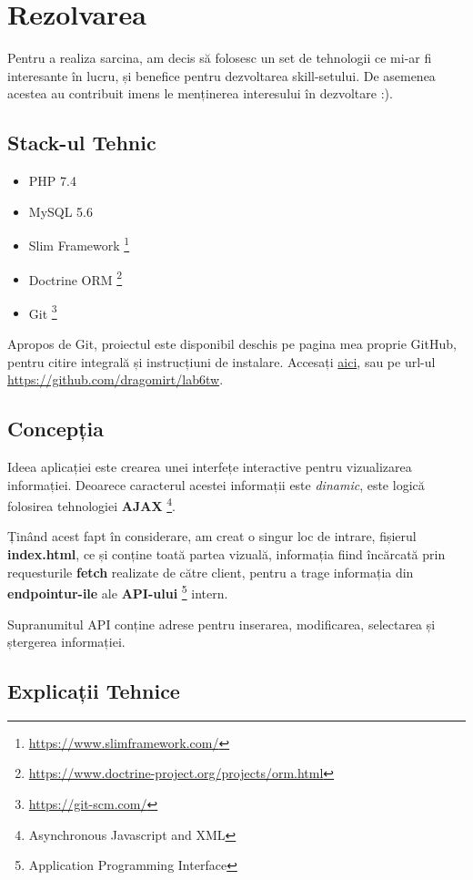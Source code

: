 \documentclass[12pt. a4paper]{report}
\begin{document}
\chapter{Rezolvarea}
Pentru a realiza sarcina, am decis să folosesc un set de tehnologii ce mi-ar fi interesante în lucru, și benefice pentru dezvoltarea skill-setului. De asemenea acestea au contribuit imens le menținerea interesului în dezvoltare :).

\section{Stack-ul Tehnic}
\begin{itemize}
	\item PHP 7.4
	\item MySQL 5.6
	\item Slim Framework \footnote{\url{https://www.slimframework.com/}}
	\item Doctrine ORM \footnote{\url{https://www.doctrine-project.org/projects/orm.html}}
	\item Git \footnote{\url{https://git-scm.com/}}
\end{itemize}

Apropos de Git, proiectul este disponibil deschis pe pagina mea proprie GitHub, pentru citire integrală și instrucțiuni de instalare. Accesați \href{https://github.com/dragomirt/lab6tw}{aici}, sau pe url-ul \url{https://github.com/dragomirt/lab6tw}.

\section{Concepția}
Ideea aplicației este crearea unei interfețe interactive pentru vizualizarea informației. Deoarece caracterul acestei informații este 
\emph{dinamic}, este logică folosirea tehnologiei \textbf{AJAX} \footnote{Asynchronous Javascript and XML}. 

Ținând acest fapt în considerare, am creat o singur loc de intrare, fișierul \textbf{index.html}, ce și conține toată partea vizuală, informația fiind încărcată prin requesturile \textbf{fetch} realizate de către client, pentru a trage informația din \textbf{endpointur-ile} ale \textbf{API-ului} \footnote{Application Programming Interface} intern.

Supranumitul API conține adrese pentru inserarea, modificarea, selectarea și ștergerea informației.

\section{Explicații Tehnice}
\end{document}
